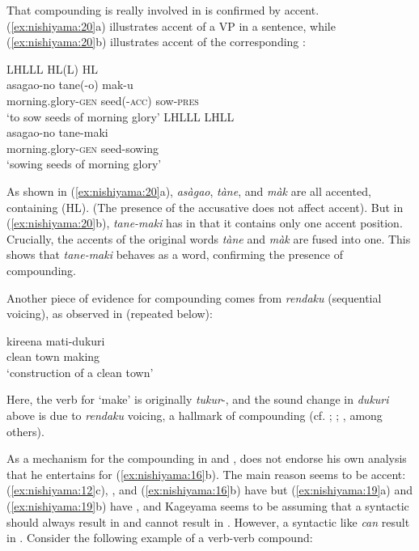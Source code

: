 \documentclass[output=paper]{LSP/langsci}
\begin{document}
That compounding is really involved in  is confirmed by accent. (\ref{ex:nishiyama:20}a) illustrates accent of a VP in a sentence, while (\ref{ex:nishiyama:20}b) illustrates accent of the corresponding :

\ea\label{ex:nishiyama:20}
 \ea 
 \glll LHLLL      HL(L)    HL\\
    asagao-no    tane(-o)    mak-u\\
    morning.glory-\textsc{gen} seed(-\textsc{acc})  sow-\textsc{pres}\\
\glt ‘to sow seeds of morning glory’
  \ex
  \glll LHLLL        LHLL\\
    asagao-no      tane-maki\\
    morning.glory-\textsc{gen}    seed-sowing\\
\glt ‘sowing seeds of morning glory’
\z \z

As shown in (\ref{ex:nishiyama:20}a), \textit{asàgao}, \textit{tàne}, and \textit{màk} are all accented, containing  (HL). (The presence of the accusative  does not affect accent). But in (\ref{ex:nishiyama:20}b), \textit{tane-maki} has  in that it contains only one accent position. Crucially, the accents of the original words \textit{tàne} and \textit{màk} are fused into one. This shows that \textit{tane-maki} behaves as a word, confirming the presence of compounding.

  Another piece of evidence for compounding comes from \textit{rendaku} (sequential voicing), as observed in  (repeated below):

\ea%
    \label{ex:nishiyama:3bis}         
    \gll kireena mati-dukuri  \\
    clean  {town making}\\
\glt ‘construction of a clean town’
\z

Here, the verb for ‘make’ is originally \textit{tukur}{}-, and the sound change in \textit{dukuri} above is due to \textit{rendaku} voicing, a hallmark of compounding (cf. \citealt[50ff]{Tsujimura2007}; \citealt{ItoMester2003}; \citealt{Kubozono2005}, among others).

As a mechanism for the compounding in  and , \citet[335]{Kageyama1993} does not endorse his own  analysis that he entertains for (\ref{ex:nishiyama:16}b). The main reason seems to be accent: (\ref{ex:nishiyama:12}c), , and (\ref{ex:nishiyama:16}b) have  but (\ref{ex:nishiyama:19}a) and (\ref{ex:nishiyama:19}b) have , and Kageyama seems to be assuming that a syntactic  should always result in  and cannot result in . However, a syntactic  like  \textit{can} result in . Consider the following example of a verb-verb compound:\largerpage
\end{document}
